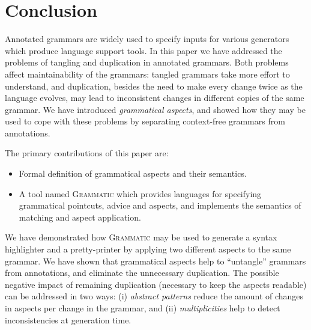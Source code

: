 \documentclass{IOS-Book-Article}     %
\newcommand{\tool}[1]{\textsc{#1}}
\newcommand{\Grammatic}[0]{\tool{Grammatic}}
\begin{document}
%
%
%
%
\section{Conclusion}\label{Conclusion}

Annotated grammars are widely used to specify inputs for various generators which produce language support tools.
In this paper we have addressed the problems of tangling and duplication in annotated grammars. Both problems affect maintainability of the grammars: tangled grammars take more effort to understand, and duplication, besides the need to make every change twice as the language evolves, may lead to inconsistent changes in different copies of the same grammar.
We have introduced \emph{grammatical aspects}, and showed how they may be used to cope with these problems by separating context-free grammars from annotations. 

The primary contributions of this paper are:
\begin{itemize}
	\item Formal definition of grammatical aspects and their semantics.
	\item A tool named \Grammatic{} which provides languages for specifying grammatical pointcuts, advice and aspects, and implements the semantics of matching and aspect application.
\end{itemize}

We have demonstrated how \Grammatic{} may be used to generate a syntax highlighter and a pretty-printer by applying two different aspects to the same grammar. We have shown that grammatical aspects help to ``untangle'' grammars from annotations, and eliminate the unnecessary duplication. The possible negative impact of remaining duplication (necessary to keep the aspects readable) can be addressed in two ways:
	(i) \emph{abstract patterns} reduce the amount of changes in aspects per change in the grammar, and
	(ii) \emph{multiplicities} help to detect inconsistencies at generation time.
\end{document}
